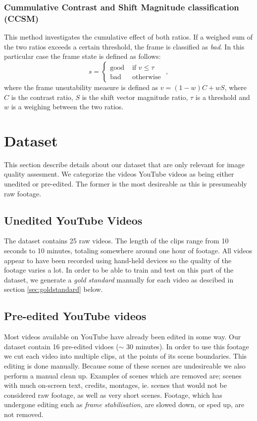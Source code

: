 \subsubsection{Cummulative Contrast and Shift Magnitude classification (CCSM)}
%
This method investigates the cumulative effect of both ratios. If a weighed sum of the two ratios exceeds a certain threshold, the frame is classified as \textit{bad}. In this particular case the frame state is defined as follows:\\
%
\[
s = 
\begin{cases}
\text{good} & \text{ if } v \leq \tau\\
\text{bad} & \text{ otherwise }
\end{cases},
\]
%
where the frame unsutability measure is defined as $v=(1-w) C + w S$, where $C$ is the contrast ratio, $S$ is the shift vector magnitude ratio, $\tau$ is a threshold and $w$ is a weighing between the two ratios.
%
\section{Dataset}
%
This section describe details about our dataset that are only relevant for image quality assesment. We categorize the videos YouTube videos as being either unedited or pre-edited. The former is the most desireable as this is presumeably raw footage.
%
\subsection{Unedited YouTube Videos}
%
The dataset contains 25 raw videos. The length of the clips range from 10 seconds to 10 minutes, totaling somewhere around one hour of footage. All videos appear to have been recorded using hand-held devices so the quality of the footage varies a lot. In order to be able to train and test on this part of the dataset, we generate a \textit{gold standard} manually for each video as descibed in section \ref{sec:goldstandard} below.
%
\subsection{Pre-edited YouTube videos}
%
Most videos available on YouTube have already been edited in some way. Our dataset contain 16 pre-edited vidoes ($\sim$ 30 minutes). In order to use this footage we cut each video into multiple clips, at the points of its scene boundaries. This editing is done manually. Because some of these scenes are undesireable we also perform a manual clean up. Examples of scenes which are removed are; scenes with much on-screen text, credits, montages, ie. scenes that would not be considered raw footage, as well as very short scenes. Footage, which has undergone editing such as \textit{frame stabilisation}, are slowed down, or sped up, are not removed.
%
